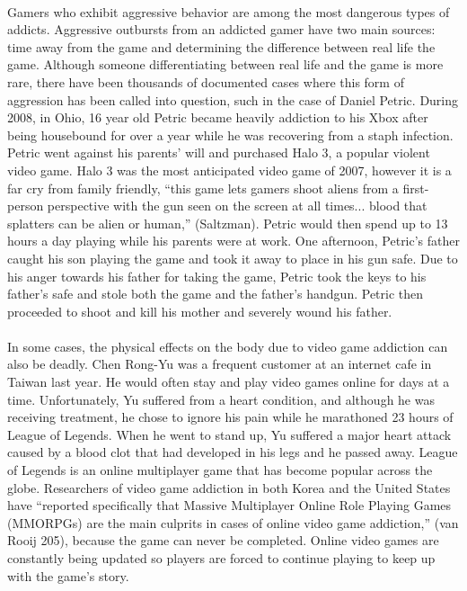 \documentclass[a4paper,man,natbib]{apa6}
\begin{document}
\paragraph{}
Gamers who exhibit aggressive behavior are among the most dangerous types of addicts. Aggressive outbursts from an addicted gamer have two main sources: time away from the game and determining the difference between real life the game. Although someone differentiating between real life and the game is more rare, there have been thousands of documented cases where this form of aggression has been called into question, such in the case of Daniel Petric. During 2008, in Ohio, 16 year old Petric became heavily addiction to his Xbox after being housebound for over a year while he was recovering from a staph infection. Petric went against his parents’ will and purchased Halo 3, a popular violent video game. Halo 3 was the most anticipated video game of 2007, however it is a far cry from family friendly, “this game lets gamers shoot aliens from a first-person perspective with the gun seen on the screen at all times... blood that splatters can be alien or human,” (Saltzman). Petric would then spend up to 13 hours a day playing while his parents were at work. One afternoon, Petric’s father caught his son playing the game and took it away to place in his gun safe. Due to his anger towards his father for taking the game, Petric took the keys to his father’s safe and stole both the game and the father’s handgun. Petric then proceeded to shoot and kill his mother and severely wound his father. 
\paragraph{}
In some cases, the physical effects on the body due to video game addiction can also be deadly. Chen Rong-Yu was a frequent customer at an internet cafe in Taiwan last year. He would often stay and play video games online for days at a time. Unfortunately, Yu suffered from a heart condition, and although he was receiving treatment, he chose to ignore his pain while he marathoned 23 hours of League of Legends. When he went to stand up, Yu suffered a major heart attack caused by a blood clot that had developed in his legs and he passed away. League of Legends is an online multiplayer game that has become popular across the globe. Researchers of video game addiction in both Korea and the United States have “reported specifically that Massive Multiplayer Online Role Playing Games (MMORPGs) are the main culprits in cases of online video game addiction,” (van Rooij 205), because the game can never be completed. Online video games are constantly being updated so players are forced to continue playing to keep up with the game’s story. 
\end{document}
